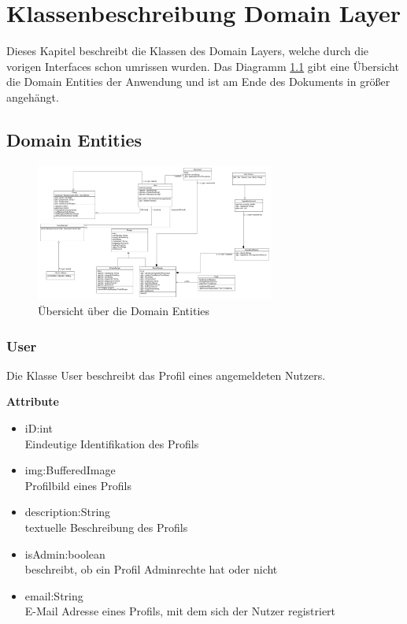 \chapter{Klassenbeschreibung Domain Layer}

Dieses Kapitel beschreibt die Klassen des Domain Layers, welche durch die vorigen Interfaces schon umrissen wurden. Das Diagramm \ref{domainentities} gibt eine Übersicht die Domain Entities der Anwendung und ist am Ende des Dokuments in größer angehängt.

\section{Domain Entities}

\begin{figure}[H]
\centering
\includegraphics[width=0.7\textwidth]{pics/Domain_Entities_ueberarbeitet.pdf}%
\caption{Übersicht über die Domain Entities}%
\label{domainentities}%
\end{figure}

\subsection{User}
Die Klasse User beschreibt das Profil eines angemeldeten Nutzers.

\textbf{Attribute}
\begin{itemize}[nosep]
	\item iD:int \\ Eindeutige Identifikation des Profils 
	\item img:BufferedImage \\ Profilbild eines Profils
	\item description:String \\ textuelle Beschreibung des Profils
	\item isAdmin:boolean \\ beschreibt, ob ein Profil Adminrechte hat oder nicht
	\item email:String \\ E-Mail Adresse eines Profils, mit dem sich der Nutzer registriert
\end{itemize}

